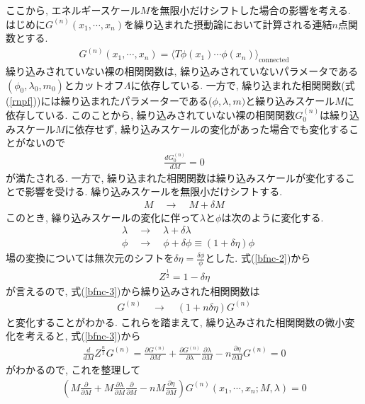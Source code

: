 ここから, エネルギースケール$M$を無限小だけシフトした場合の影響を考える.
はじめに$G^{(n)}(x_1,\cdots,x_n)$を繰り込まれた摂動論において計算される連結$n$点関数とする.
\begin{align}
  G^{(n)}(x_1,\cdots,x_n) = \langle T\phi(x_1)\cdots\phi(x_n) \rangle_{\text{connected}}\label{rnpf}
\end{align}
繰り込みされていない裸の相関関数は, 繰り込みされていないパラメータである$(\phi_0,\lambda_0,m_0)$とカットオフ$\Lambda$に依存している.
一方で, 繰り込まれた相関関数(式(\ref{rnpf}))には繰り込まれたパラメーターである($\phi,\lambda,m)$と繰り込みスケール$M$に依存している.
このことから, 繰り込みされていない裸の相関関数$G^{(n)}_0$は繰り込みスケール$M$に依存せず, 繰り込みスケールの変化があった場合でも変化することがないので
\begin{align}
  \frac{d G_0^{(n)}}{dM} = 0 \label{bfnc-3}
\end{align}
が満たされる.
一方で, 繰り込まれた相関関数は繰り込みスケールが変化することで影響を受ける.
繰り込みスケールを無限小だけシフトする.
\begin{align}
  M\quad\rightarrow\quad M + \delta M \label{sftM}
\end{align}
このとき, 繰り込みスケールの変化に伴って$\lambda$と$\phi$は次のように変化する.
\begin{align}
  &\lambda \quad\rightarrow\quad \lambda + \delta \lambda \label{sftl}\\
  &\phi \quad\rightarrow\quad \phi+ \delta\phi \equiv (1+\delta\eta)\phi \label{sftp}
\end{align}
場の変換については無次元のシフトを$\delta \eta  = \frac{\delta\phi}{\phi}$とした.
式(\ref{bfnc-2})から
\begin{align}
  Z^{\frac{1}{2}} = 1 - \delta\eta\label{bfnc-4}
\end{align}
が言えるので, 式(\ref{bfnc-3})から繰り込みされた相関関数は
\begin{align}
  G^{(n)}\quad\rightarrow\quad(1+n\delta\eta)G^{(n)}\label{sftg}
\end{align}
と変化することがわかる.
これらを踏まえて, 繰り込みされた相関関数の微小変化を考えると, 式(\ref{bfnc-3})から
\begin{align}
  \frac{d}{dM} Z^{\frac{n}{2}}G^{(n)} = \frac{\partial G^{(n)}}{\partial M} + \frac{\partial G^{(n)}}{\partial \lambda}\frac{\partial \lambda}{\partial M} - n \frac{\partial \eta}{\partial M}G^{(n)} = 0
\end{align}
がわかるので, これを整理して
\begin{align}
  \left(M \frac{\partial}{\partial M} + M\frac{\partial \lambda}{\partial M} \frac{\partial}{\partial M} -nM\frac{\partial \eta}{\partial M}\right)G^{(n)}(x_1,\cdots,x_n;M,\lambda) = 0\label{CS-1}
\end{align}
